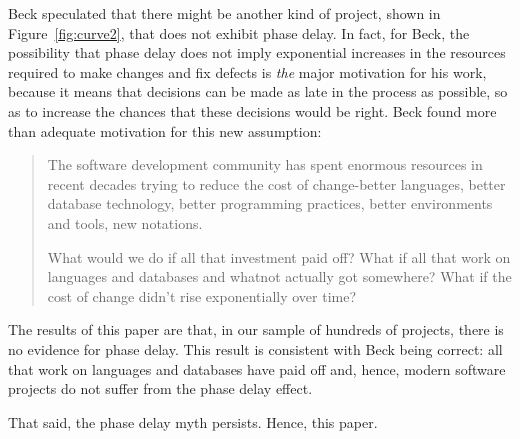 \documentclass{sig-alternate}
\newcommand{\fig}[1]{Figure~\ref{fig:#1}}
\begin{document}
Beck speculated that there might be another kind of project, shown in \fig{curve2},
that does not exhibit phase delay. In fact, for Beck, the possibility that phase delay does not imply exponential increases in the resources required to make changes and fix defects is {\em the} major
motivation for his work, because it means that decisions can be made as late in the process as possible, so as to increase the chances that these decisions would be right. Beck found more than adequate motivation for this new assumption:
\begin{quote}
The software development community has spent enormous resources in recent decades trying to reduce the cost of change-better languages, better database technology, better programming practices, better environments and tools, new notations.

What would we do if all that investment paid off? What if all that work on languages and databases and whatnot actually got somewhere? What if the cost of change didn't rise exponentially over time?~\cite{beck00}
\end{quote}
The results of this paper are that, in our sample of hundreds of projects, there is no evidence for phase delay.
This result is   consistent with Beck being correct: all that work on    languages and databases
have paid off and, hence, modern software projects do not suffer from the  phase delay effect.  

That said,  the phase delay myth persists. Hence, this paper.

 
\end{document}
